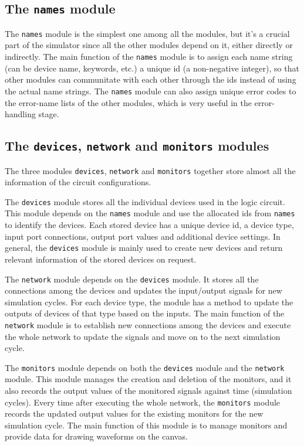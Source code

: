 \documentclass[10pt,a4paper]{article}
\begin{document}
\subsection{The \texttt{names} module}
\label{sec:orgb27eba3}

The \texttt{names} module is the simplest one among all the modules, but it's
a crucial part of the simulator since all the other modules depend on
it, either directly or indirectly. The main function of the \texttt{names}
module is to assign each name string (can be device name, keywords,
etc.) a unique id (a non-negative integer), so that other modules can
communitate with each other through the ids instead of using the
actual name strings. The \texttt{names} module can also assign unique error
codes to the error-name lists of the other modules, which is very
useful in the error-handling stage. 

\subsection{The \texttt{devices}, \texttt{network} and \texttt{monitors} modules}
\label{sec:org0a9238d}

The three modules \texttt{devices}, \texttt{network} and \texttt{monitors} together store
almost all the information of the circuit configurations.

The \texttt{devices} module stores all the individual devices used in the
logic circuit. This module depends on the \texttt{names} module and use the
allocated ids from \texttt{names} to identify the devices. Each stored device
has a unique device id, a device type, input port connections, output
port values and additional device settings. In general, the \texttt{devices}
module is mainly used to create new devices and return relevant
information of the stored devices on request.

The \texttt{network} module depends on the \texttt{devices} module. It stores all
the connections among the devices and updates the input/output
signals for new simulation cycles. For each device type, the module
has a method to update the outputs of devices of that type based on
the inputs. The main function of the \texttt{network} module is to establish
new connections among the devices and execute the whole network to
update the signals and move on to the next simulation cycle.

The \texttt{monitors} module depends on both the \texttt{devices} module and the
\texttt{network} module. This module manages the creation and deletion of the
monitors, and it also records the output values of the monitored
signals against time (simulation cycles). Every time after executing
the whole network, the \texttt{monitors} module records the updated output
values for the existing monitors for the new simulation cycle. The
main function of this module is to manage monitors and provide data
for drawing waveforms on the canvas.
\end{document}
